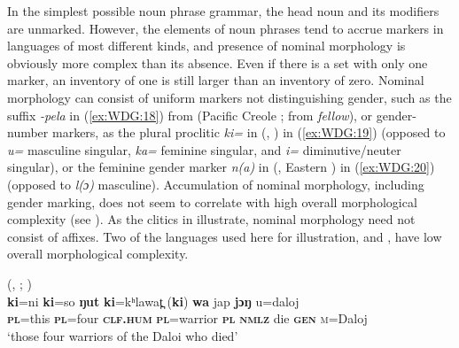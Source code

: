 \documentclass[output=collectionpaper]{langsci/langscibook}
\begin{document}
In the simplest possible noun phrase grammar, the head noun and its modifiers are unmarked. However, the elements of noun phrases tend to accrue markers in languages of most different kinds, and presence of nominal morphology is obviously more complex than its absence. Even if there is a set with only one marker, an inventory of one is still larger than an inventory of zero. Nominal morphology can consist of uniform markers not distinguishing gender, such as the suffix \textit{-pela} in (\ref{ex:WDG:18}) from  (Pacific Creole ; from  \textit{fellow}), or gender-number markers, as the plural proclitic \textit{ki=} in  (, ) in (\ref{ex:WDG:19}) (opposed to \textit{u=} masculine singular, \textit{ka=} feminine singular, and \textit{i=} diminutive/neuter singular), or the feminine gender marker \textit{n(a)} in  (, Eastern ) in (\ref{ex:WDG:20}) (opposed to \textit{l(ɔ)} masculine). Accumulation of nominal morphology, including gender marking, does not seem to correlate with high overall morphological complexity (see ). As the clitics in  illustrate, nominal morphology need not consist of affixes. Two of the languages used here for illustration,  and , have low overall morphological complexity.

%

\ea\label{ex:WDG:19}
 (, ; \citealt[339]{Ring2015})\\
\gll	\textbf{ki}=ni	\textbf{ki}=so	\textbf{ŋut}	\textbf{ki}=kʰlawat̪	(\textbf{ki})	\textbf{wa}	jap	\textbf{jɔŋ}	u=daloj\\
	\textbf{\textsc{pl}}=this	\textbf{\textsc{pl}}=four	\textbf{\textsc{clf.hum}}	\textbf{\textsc{pl}}=warrior	\textbf{\textsc{pl}}	\textbf{\textsc{nmlz}}	die	\textbf{\textsc{gen}}	\textsc{m}=Daloj\\
\glt	`those four warriors of the Daloi who died'\\
\z
\end{document}
